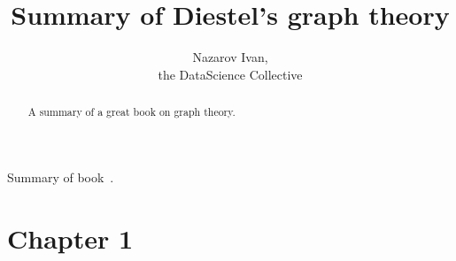 \documentclass[a4paper]{article}
\title{Summary of Diestel's graph theory}
\author{Nazarov Ivan, \rus{101мНОД(ИССА)}\\the DataScience Collective}
\begin{document}
\maketitle

\begin{abstract}
	A summary of a great book on graph theory.
\end{abstract}

\tableofcontents
\clearpage

Summary of book~\cite{diestel2006}.

\section{Chapter 1} %
\label{sec:chapter_1}





\end{document}
